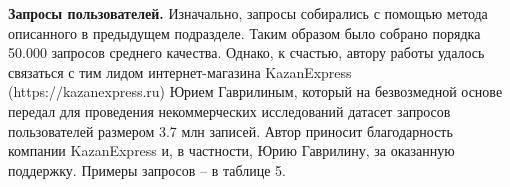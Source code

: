 \documentclass[12pt,a4paper]{article}
\begin{document}
\begin{table}[H]
\begin{center}
    \caption{Примеры товаров из даннных с соревнования DataFusion}
\end{center}
\end{table}

\textbf{Запросы пользователей.} Изначально, запросы собирались с помощью метода описанного в предыдущем подразделе. Таким образом было собрано порядка 50.000 запросов среднего качества. Однако, к счастью, автору работы удалось связаться с тим лидом интернет-магазина KazanExpress (https://kazanexpress.ru) Юрием Гаврилиным, который на безвозмедной основе передал для проведения некоммерческих исследований датасет запросов пользователей размером 3.7 млн записей. Автор приносит благодарность компании KazanExpress и, в частности, Юрию Гаврилину, за оказанную поддержку. Примеры запросов -- в таблице 5.

\begin{table}[H]
\begin{center}
    \caption{Примеры запросов в поисковую систему KazanExpress}
\end{center}
\end{table}
\end{document}
